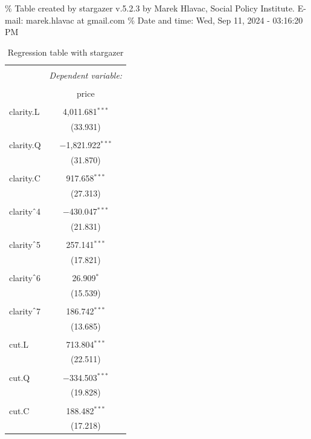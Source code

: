 \documentclass[
]{article}
\begin{document}
\% Table created by stargazer v.5.2.3 by Marek Hlavac, Social Policy
Institute. E-mail: marek.hlavac at gmail.com \% Date and time: Wed, Sep
11, 2024 - 03:16:20 PM

\begin{table}[!htbp] \centering 
  \caption{Regression table with stargazer} 
  \label{tab1} 
\begin{tabular}{@{\extracolsep{5pt}}lc} 
\\[-1.8ex]\hline 
\hline \\[-1.8ex] 
 & \multicolumn{1}{c}{\textit{Dependent variable:}} \\ 
\cline{2-2} 
\\[-1.8ex] & price \\ 
\hline \\[-1.8ex] 
 clarity.L & 4,011.681$^{***}$ \\ 
  & (33.931) \\ 
  & \\ 
 clarity.Q & $-$1,821.922$^{***}$ \\ 
  & (31.870) \\ 
  & \\ 
 clarity.C & 917.658$^{***}$ \\ 
  & (27.313) \\ 
  & \\ 
 clarity$\hat{\mkern6mu}$4 & $-$430.047$^{***}$ \\ 
  & (21.831) \\ 
  & \\ 
 clarity$\hat{\mkern6mu}$5 & 257.141$^{***}$ \\ 
  & (17.821) \\ 
  & \\ 
 clarity$\hat{\mkern6mu}$6 & 26.909$^{*}$ \\ 
  & (15.539) \\ 
  & \\ 
 clarity$\hat{\mkern6mu}$7 & 186.742$^{***}$ \\ 
  & (13.685) \\ 
  & \\ 
 cut.L & 713.804$^{***}$ \\ 
  & (22.511) \\ 
  & \\ 
 cut.Q & $-$334.503$^{***}$ \\ 
  & (19.828) \\ 
  & \\ 
 cut.C & 188.482$^{***}$ \\ 
  & (17.218) \\ 

\end{tabular}
\end{table}
\end{document}
